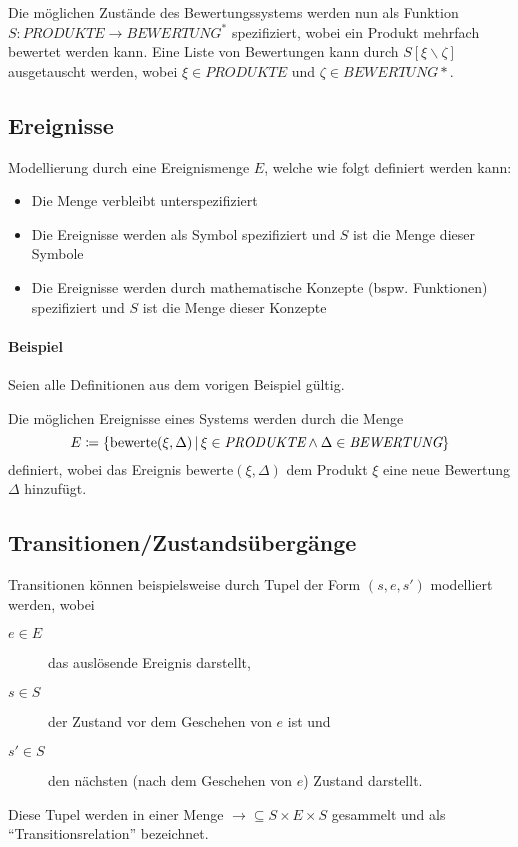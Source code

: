 				Die möglichen Zustände des Bewertungssystems werden nun als Funktion $ S : \textit{PRODUKTE} \rightarrow \textit{BEWERTUNG} ^ * $ spezifiziert, wobei ein Produkt mehrfach bewertet werden kann. Eine Liste von Bewertungen kann durch $ S[\xi \backslash \zeta] $ ausgetauscht werden, wobei $ \xi \in \textit{PRODUKTE} $ und $ \zeta \in \textit{BEWERTUNG}* $.
	    
	    \subsection{Ereignisse}
		    Modellierung durch eine Ereignismenge $ E $, welche wie folgt definiert werden kann:
		    \begin{itemize}
		    	\item Die Menge verbleibt unterspezifiziert
		    	\item Die Ereignisse werden als Symbol spezifiziert und $ S $ ist die Menge dieser Symbole
		    	\item Die Ereignisse werden durch mathematische Konzepte (bspw. Funktionen) spezifiziert und $ S $ ist die Menge dieser Konzepte
		    \end{itemize}
		    
		    \paragraph{Beispiel}
			    Seien alle Definitionen aus dem vorigen Beispiel gültig.
			    
			    Die möglichen Ereignisse eines Systems werden durch die Menge \[ E \coloneqq \{ \text{bewerte}(\xi, \Delta) \,\vert\, \xi \in \textit{PRODUKTE} \land \Delta \in \textit{BEWERTUNG} \} \] definiert, wobei das Ereignis $ \text{bewerte}(\xi, \Delta) $ dem Produkt $ \xi $ eine neue Bewertung $ \Delta $ hinzufügt.
	    
	    \subsection{Transitionen/Zustandsübergänge}
		    Transitionen können beispielsweise durch Tupel der Form $ (s, e, s') $ modelliert werden, wobei
		    \begin{description}
		    	\item[$ e \in E $] das auslösende Ereignis darstellt,
		    	\item[$ s \in S $] der Zustand vor dem Geschehen von $ e $ ist und
		    	\item[$ s' \in S $] den nächsten (nach dem Geschehen von $ e $) Zustand darstellt.
		    \end{description}
		    Diese Tupel werden in einer Menge $ \rightarrow \subseteq S \times E \times S $ gesammelt und als \enquote{Transitionsrelation} bezeichnet.
		    
